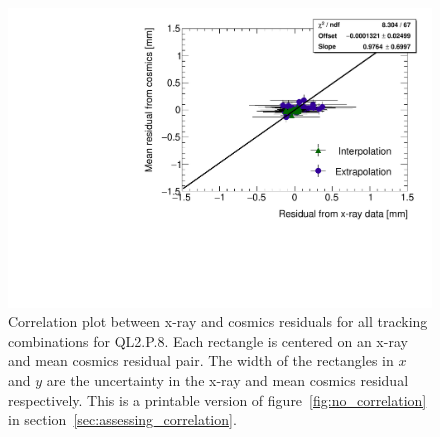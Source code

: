 \begin{figure}
    \centering
    \includegraphics[width = \textwidth]{figures/figure_QL2P08_3100V_2021-08-16_QL2P08_local_cosmic_and_xray_data_correlation_plot_printable.pdf}
    \caption{Correlation plot between x-ray and cosmics residuals for all tracking combinations for QL2.P.8. Each rectangle is centered on an x-ray and mean cosmics residual pair. The width of the rectangles in $x$ and $y$ are the uncertainty in the x-ray and mean cosmics residual respectively. This is a printable version of figure~\ref{fig:no_correlation} in section~\ref{sec:assessing_correlation}.}
    \label{fig:no_correlation_print}
\end{figure}